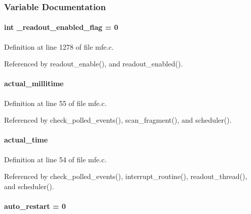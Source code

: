 \subsubsection{Variable Documentation}
\paragraph[{\_\-readout\_\-enabled\_\-flag}]{\setlength{\rightskip}{0pt plus 5cm}int {\bf \_\-readout\_\-enabled\_\-flag} = 0}\hfill\label{mfe_8c_a5b555b249c0a043a3fc3b948eef7658b}


Definition at line 1278 of file mfe.c.

Referenced by readout\_\-enable(), and readout\_\-enabled().
\paragraph[{actual\_\-millitime}]{ {\bf actual\_\-millitime}}\hfill\label{mfe_8c_a74876f64e556e153bb8cce6dfddce810}


Definition at line 55 of file mfe.c.

Referenced by check\_\-polled\_\-events(), scan\_\-fragment(), and scheduler().
\paragraph[{actual\_\-time}]{ {\bf actual\_\-time}}\hfill\label{mfe_8c_a6431147bd66aebfe3ca728d244da1253}


Definition at line 54 of file mfe.c.

Referenced by check\_\-polled\_\-events(), interrupt\_\-routine(), readout\_\-thread(), and scheduler().
\paragraph[{auto\_\-restart}]{ {\bf auto\_\-restart} = 0}\hfill\label{mfe_8c_a7f7c6b4a8ba5367aa160c2ba35c63f3c}


